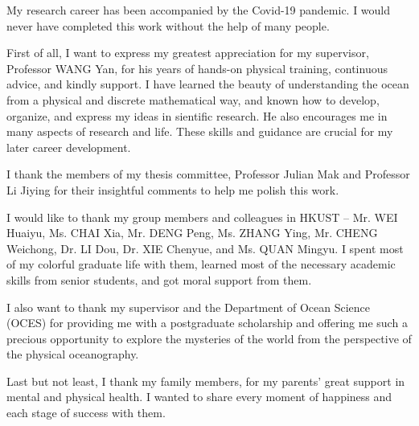 \acknowledgments

My research career has been accompanied by the Covid-19 pandemic. I would never have completed this work without the help of many people.

First of all, I want to express my greatest appreciation for my supervisor, Professor WANG Yan, for his years of hands-on physical training, continuous advice, and kindly support. I have learned the beauty of understanding the ocean from a physical and discrete mathematical way, and known how to develop, organize, and express my ideas in sientific research. He also encourages me in many aspects of research and life. These skills and guidance are crucial for my later career development.

I thank the members of my thesis committee, Professor Julian Mak and Professor Li Jiying for their insightful comments to help me polish this work. 

I would like to thank my group members and colleagues in HKUST -- Mr. WEI Huaiyu, Ms. CHAI Xia, Mr. DENG Peng, Ms. ZHANG Ying, Mr. CHENG Weichong, Dr. LI Dou, Dr. XIE Chenyue, and Ms. QUAN Mingyu. I spent most of my colorful graduate life with them, learned most of the necessary academic skills from senior students, and got moral support from them.

I also want to thank my supervisor and the Department of Ocean Science (OCES) for providing me with a postgraduate scholarship and offering me such a precious opportunity to explore the mysteries of the world from the perspective of the physical oceanography. 

Last but not least, I thank my family members, for my parents' great support in mental and physical health. I wanted to share every moment of happiness and each stage of success with them.

\endacknowledgments
